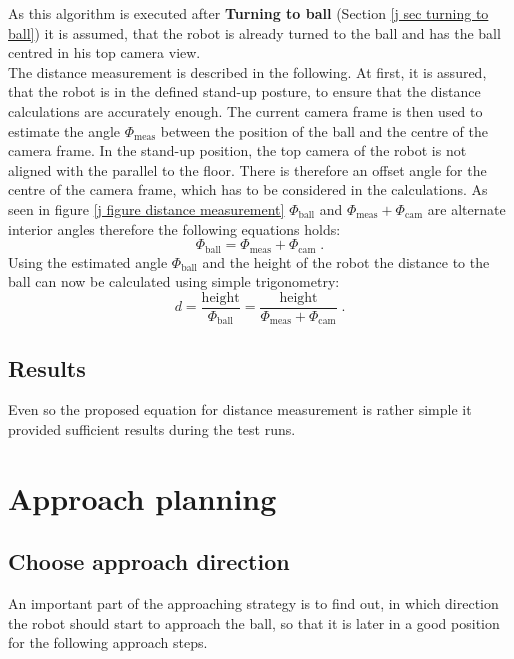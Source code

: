 As this algorithm is executed after \textbf{Turning to ball} (Section \ref{j sec turning to ball}) it is assumed, that the robot is already turned to the ball and has the ball centred in his top camera view. \\
The distance measurement is described in the following. At first, it is assured, that the robot is in the defined stand-up posture, to ensure that the distance calculations are accurately enough. The current camera frame is then used to estimate the angle $ \Phi_{\mathrm{meas}} $ between the position of the ball and the centre of the camera frame. In the stand-up position, the top camera of the robot is not aligned with the parallel to the floor. There is therefore an offset angle for the centre of the camera frame, which has to be considered in the calculations. As seen in figure \ref{j figure distance measurement} $ \Phi_{\mathrm{ball}} $ and $ \Phi_{\mathrm{meas}}+\Phi_{\mathrm{cam}} $ are alternate interior angles therefore the following equations holds: 
\begin{equation}
	\Phi_{\mathrm{ball}} = \Phi_{\mathrm{meas}}+\Phi_{\mathrm{cam}} \; .
\end{equation}
Using the estimated angle $ \Phi_{\mathrm{ball}} $ and the height of the robot the distance to the ball can now be calculated using simple trigonometry: 
\begin{equation}
	d = \frac{\mathrm{height}}{\Phi_{\mathrm{ball}}} = \frac{\mathrm{height}}{\Phi_{\mathrm{meas}}+\Phi_{\mathrm{cam}}} \; .
\end{equation}

\subsection*{Results}
Even so the proposed equation for distance measurement is rather simple it provided sufficient results during the test runs. 


\section{Approach planning}
\subsection*{Choose approach direction}
An important part of the approaching strategy is to find out, in which direction the robot should start to approach the ball, so that it is later in a good position for the following approach steps. 

